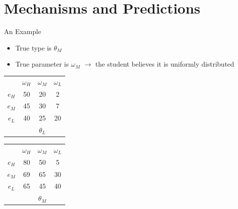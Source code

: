 \documentclass[aspectratio=169]{beamer}
\begin{document}
\section*{Mechanisms and Predictions}

\begin{frame}{An Example}
    \begin{itemize}
        \item True type is $\theta_M$ \\
        \bigskip
        \item True parameter is $\omega_M$ $\rightarrow$ the student believes it is uniformly distributed\\
        \end{itemize}

        \centering
    \begin{tabular}{ c|c|c|c|}
    
    \multicolumn{1}{c}{} & \multicolumn{1}{c}{$\omega_H$} & \multicolumn{1}{c}{$\omega_M$} & \multicolumn{1}{c}{$\omega_L$}\\
    \cline{2-4}
    $e_H$ & 50 & 20 & 2 \\
    \cline{2-4}
    $e_M$ & 45 & 30 & 7 \\
    \cline{2-4}
    $e_L$ & 40 & 25 & 20 \\
    \cline{2-4}
    \multicolumn{1}{c}{} & \multicolumn{1}{c}{} & \multicolumn{1}{c}{$\theta_L$} & \multicolumn{1}{c}{}\\
    \end{tabular}
    \hspace{.3cm} %
    \begin{tabular}{ c|c|c|c|}
    
    \multicolumn{1}{c}{} & \multicolumn{1}{c}{$\omega_H$} & \multicolumn{1}{c}{$\omega_M$} & \multicolumn{1}{c}{$\omega_L$}\\
    \cline{2-4}
    $e_H$ & 80 & \cellcolor{blue!25}50 & 5 \\
    \cline{2-4}
    $e_M$ & 69 & \cellcolor{blue!25}65 & 30 \\
    \cline{2-4}
    $e_L$ & 65 & \cellcolor{blue!25}45 & 40 \\
    \cline{2-4}
    \multicolumn{1}{c}{} & \multicolumn{1}{c}{} & \multicolumn{1}{c}{$\theta_M$} & \multicolumn{1}{c}{}\\
    \end{tabular}
    \hspace{.3cm} %
    \begin{tabular}{ c|c|c|c|}
    

\end{tabular}
\end{frame}
\end{document}
